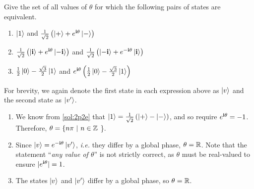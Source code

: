 \section{}

Give the set of all values of $\theta$ for which the following pairs of states are equivalent.
\begin{enumerate}[label=\alph*.,ref={Ex.~\thesection\alph*}]
\label{ex:2p5}
    \item $\ket{1}$ and $\tfrac{1}{\sqrt{2}} \left ( \ket{+} + e^{\mathbf{i} \theta} \ket{-} \right )$
    \item $\tfrac{1}{\sqrt{2}} \left ( \ket{\mathbf{i}} + e^{\mathbf{i} \theta} \ket{- \mathbf{i}} \right )$ and $\tfrac{1}{\sqrt{2}} \left ( \ket{- \mathbf{i}} + e^{- \mathbf{i} \theta} \ket{\mathbf{i}} \right )$
    \item $\tfrac{1}{2} \ket{0} - \tfrac{\sqrt{3}}{2} \ket{1}$ and $e^{\mathbf{i} \theta} \left ( \tfrac{1}{2} \ket{0} - \tfrac{\sqrt{3}}{2} \ket{1} \right )$
\end{enumerate}

{\Sol}
For brevity, we again denote the first state in each expression above as $\ket{v}$ and the second
state as $\ket{v'}$.

\begin{enumerate}[label=\alph*.,ref={Sol.~\thesection\alph*}]
\label{sol:2p5}
    \item We know from \ref{sol:2p2e} that $\ket{1} = \tfrac{1}{\sqrt{2}} \left ( \ket{+} - \ket{-} \right )$, and so require $e^{\mathbf{i} \theta} = -1$.
    Therefore, $\theta = \{n \pi~|~n\in \mathbb{Z}$ \}.
    \item Since $\ket{v} = e^{- \mathbf{i} \theta} \ket{v'}$, \textit{i.e.} they differ by a global phase, $\theta = \mathbb{R}$.
    Note that the statement ``\textit{any value of $\theta$}'' is not strictly correct, as $\theta$ must be real-valued
    to ensure $|e^{\mathbf{i} \theta}| = 1$.
    \item The states $\ket{v}$ and $\ket{v'}$ differ by a global phase, so $\theta = \mathbb{R}$.
\end{enumerate}
